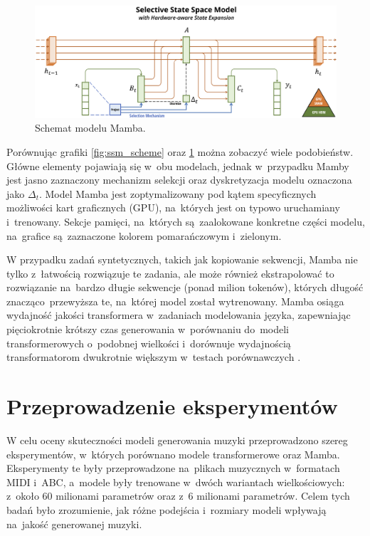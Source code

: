 \documentclass[data-science]{agh-wi} %
\begin{document}
\begin{figure}[ht!]
    \begin{center}
        \includegraphics[width=0.9\linewidth]{img/mamba1.png}
    \end{center}
    \caption{Schemat modelu Mamba.}
    \label{fig:mamba1}
\end{figure}

Porównując grafiki \ref*{fig:ssm_scheme} oraz \ref*{fig:mamba1} \cite*{mamba_obrazek} można zobaczyć wiele podobieństw. Główne elementy pojawiają się w~obu modelach, jednak w~przypadku Mamby jest jasno zaznaczony mechanizm selekcji oraz dyskretyzacja modelu oznaczona jako $\Delta_t$. Model Mamba jest zoptymalizowany pod kątem specyficznych możliwości kart graficznych (GPU), na~których jest on typowo uruchamiany i~trenowany. Sekcje pamięci, na~których są~zaalokowane konkretne części modelu, na~grafice są~zaznaczone kolorem pomarańczowym i~zielonym.

W przypadku zadań syntetycznych, takich jak kopiowanie sekwencji, Mamba nie tylko z~łatwością rozwiązuje te zadania, ale może również ekstrapolować to rozwiązanie na~bardzo długie sekwencje (ponad milion tokenów), których długość znacząco~przewyższa te, na~której model został wytrenowany. Mamba osiąga wydajność jakości transformera w~zadaniach modelowania języka, zapewniając pięciokrotnie krótszy czas generowania w~porównaniu do~modeli transformerowych o~podobnej wielkości i~dorównuje wydajnością transformatorom dwukrotnie większym w~testach porównawczych \cite{mamba}.

\chapter{Przeprowadzenie eksperymentów}
W celu oceny skuteczności modeli generowania muzyki przeprowadzono szereg eksperymentów, w~których porównano modele transformerowe oraz Mamba. Eksperymenty te były przeprowadzone na~plikach muzycznych w~formatach MIDI i~ABC, a~modele były trenowane w~dwóch wariantach wielkościowych: z~około 60 milionami parametrów oraz z~6 milionami parametrów. Celem tych badań było zrozumienie, jak różne podejścia i~rozmiary modeli wpływają na~jakość generowanej muzyki.
\end{document}

